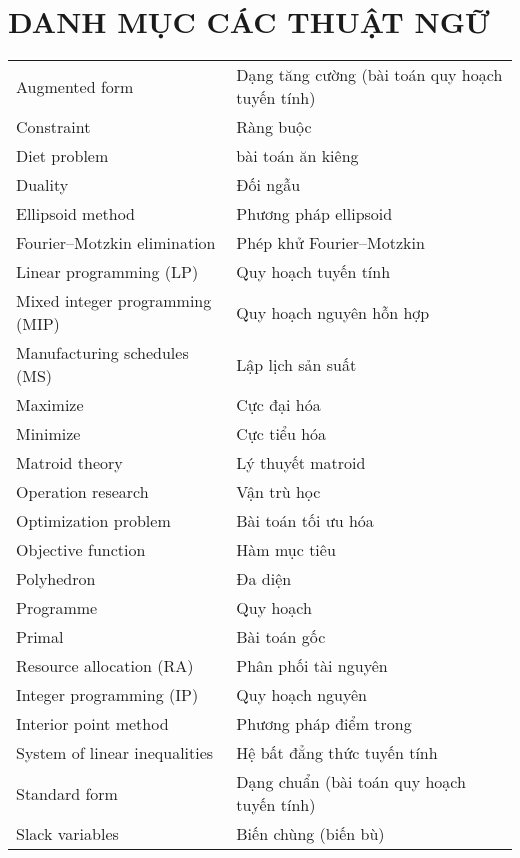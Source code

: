 \chapter*{DANH MỤC CÁC THUẬT NGỮ}
\begin{center}
	\begin{longtable}{ l  l }
        Augmented form & Dạng tăng cường (bài toán quy hoạch tuyến tính) \\
        Constraint & Ràng buộc \\
        Diet problem & bài toán ăn kiêng \\
        Duality & Đối ngẫu \\
        Ellipsoid method & Phương pháp ellipsoid \\ 
        Fourier–Motzkin elimination & Phép khử Fourier–Motzkin \\
        Linear programming (LP) & Quy hoạch tuyến tính \\
        Mixed integer programming (MIP) & Quy hoạch nguyên hỗn hợp\\
        Manufacturing schedules (MS) & Lập lịch sản suất \\
        Maximize & Cực đại hóa \\
        Minimize & Cực tiểu hóa \\
        Matroid theory & Lý thuyết matroid \\
        Operation research & Vận trù học \\
        Optimization problem & Bài toán tối ưu hóa \\
        Objective function & Hàm mục tiêu \\ 
        Polyhedron & Đa diện \\
        Programme & Quy hoạch \\
        Primal & Bài toán gốc \\
        Resource allocation (RA) & Phân phối tài nguyên \\
        Integer programming (IP) & Quy hoạch nguyên \\
        Interior point method & Phương pháp điểm trong \\
        System of linear inequalities & Hệ bất đẳng thức tuyến tính \\
        Standard form & Dạng chuẩn (bài toán quy hoạch tuyến tính) \\
        Slack variables & Biến chùng (biến bù) \\
\end{longtable}

\end{center}